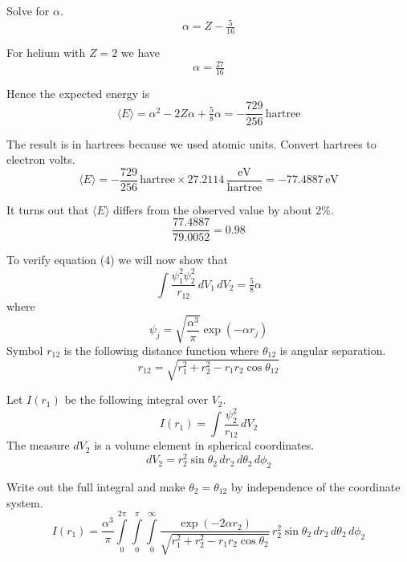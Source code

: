 \documentclass[12pt]{article}
\begin{document}
Solve for $\alpha$.
\begin{equation*}
\alpha=Z-\tfrac{5}{16}
\end{equation*}

For helium with $Z=2$ we have
\begin{equation*}
\alpha=\tfrac{27}{16}
\end{equation*}

Hence the expected energy is
\begin{equation*}
\langle E\rangle
=\alpha^2-2Z\alpha+\tfrac{5}{8}\alpha
=-\frac{729}{256}\,\text{hartree}
\end{equation*}

The result is in hartrees because we used atomic units.
Convert hartrees to electron volts.
\begin{equation*}
\langle E\rangle=-\frac{729}{256}\,\text{hartree}\times27.2114\,\frac{\text{eV}}{\text{hartree}}=-77.4887\,\text{eV}
\end{equation*}

It turns out that $\langle E\rangle$ differs from the observed value by about 2\%.
\begin{equation*}
\frac{77.4887}{79.0052}=0.98
\end{equation*}

To verify equation (4) we will now show that
\begin{equation*}
\int\frac{\psi_1^2\psi_2^2}{r_{12}}\,dV_1\,dV_2=\tfrac{5}{8}\alpha
\end{equation*}
where
\begin{equation*}
\psi_j=\sqrt{\frac{\alpha^3}{\pi}}\exp\left(-\alpha r_j\right)
\end{equation*}
Symbol $r_{12}$ is the following distance function where $\theta_{12}$ is angular separation.
\begin{equation*}
r_{12}=\sqrt{r_1^2+r_2^2-r_1r_2\cos\theta_{12}}
\end{equation*}

Let $I(r_1)$ be the following integral over $V_2$.
\begin{equation*}
I(r_1)=\int\frac{\psi_2^2}{r_{12}}\,dV_2
\end{equation*}
The measure $dV_2$ is a volume element in spherical coordinates.
\begin{equation*}
dV_2=r_2^2\sin\theta_2\,dr_2\,d\theta_2\,d\phi_2
\end{equation*}

Write out the full integral and make $\theta_2=\theta_{12}$ by independence of the coordinate system.
\begin{equation*}
I(r_1)=\frac{\alpha^3}{\pi}
\int\limits_0^{2\pi}\int\limits_0^\pi\int\limits_0^\infty
\frac{\exp(-2\alpha r_2)}{\sqrt{r_1^2+r_2^2-r_1r_2\cos\theta_2}}
\,r_2^2\sin\theta_2\,dr_2\,d\theta_2\,d\phi_2
\end{equation*}
\end{document}
